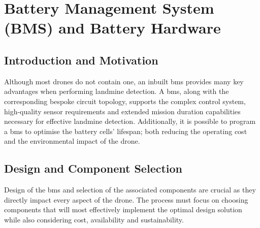 


\section{Battery Management System (BMS) and Battery Hardware}
\label{sec:bms}
\subsection{Introduction and Motivation}

Although most drones do not contain one, an inbuilt \acrshort{bms} \cite{SON2023120186} provides many key advantages when performing landmine detection. A \acrshort{bms}, along with the corresponding bespoke circuit topology, supports the complex control system, high-quality sensor requirements and extended mission duration capabilities necessary for effective landmine detection. Additionally, it is possible to program a \acrshort{bms} to optimise the battery cells’ lifespan; both reducing the operating cost and the environmental impact of the drone.

\subsection{Design and Component Selection}

Design of the \acrshort{bms} and selection of the associated components are crucial as they directly impact every aspect of the drone. The process must focus on choosing components that will most effectively implement the optimal design solution while also considering cost, availability and sustainability. 



